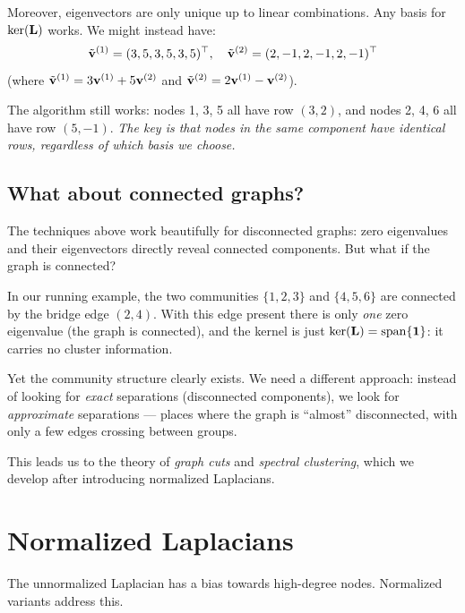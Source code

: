 \begin{notechapter}
\begin{remark}
Moreover, eigenvectors are only unique up to linear combinations. Any basis for $\ker(\mathbf{L})$ works. We might instead have:
\[
\tilde{\mathbf{v}}^{(1)} = (3,5,3,5,3,5)^\top, \quad \tilde{\mathbf{v}}^{(2)} = (2,-1,2,-1,2,-1)^\top
\]
(where $\tilde{\mathbf{v}}^{(1)} = 3\mathbf{v}^{(1)} + 5\mathbf{v}^{(2)}$ and $\tilde{\mathbf{v}}^{(2)} = 2\mathbf{v}^{(1)} - \mathbf{v}^{(2)}$).

The algorithm still works: nodes 1, 3, 5 all have row $(3, 2)$, and nodes 2, 4, 6 all have row $(5, -1)$. \emph{The key is that nodes in the same component have identical rows, regardless of which basis we choose.}
\end{remark}

\subsection{What about connected graphs?}

The techniques above work beautifully for disconnected graphs: zero eigenvalues and their eigenvectors directly reveal connected components. But what if the graph is connected?

\begin{intuition}
In our running example, the two communities $\{1, 2, 3\}$ and $\{4, 5, 6\}$ are connected by the bridge edge $(2, 4)$. With this edge present there is only \emph{one} zero eigenvalue (the graph is connected), and the kernel is just $\ker(\mathbf{L}) = \mathrm{span}\{\mathbf{1}\}$: it carries no cluster information.

Yet the community structure clearly exists. We need a different approach: instead of looking for \emph{exact} separations (disconnected components), we look for \emph{approximate} separations --- places where the graph is ``almost'' disconnected, with only a few edges crossing between groups.

This leads us to the theory of \emph{graph cuts} and \emph{spectral clustering}, which we develop after introducing normalized Laplacians.
\end{intuition}

\section{Normalized Laplacians}

The unnormalized Laplacian has a bias towards high-degree nodes. Normalized variants address this.


\end{notechapter}
